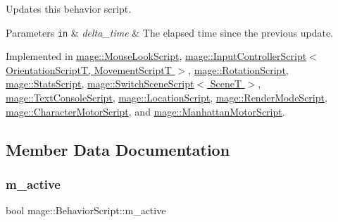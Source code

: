 Updates this behavior script.


\begin{DoxyParams}[1]{Parameters}
\mbox{\tt in}  & {\em delta\+\_\+time} & The elapsed time since the previous update. \\
\hline
\end{DoxyParams}


Implemented in \hyperlink{classmage_1_1_mouse_look_script_a7962403a78c02b2fe64e8f06f6319312}{mage\+::\+Mouse\+Look\+Script}, \hyperlink{classmage_1_1_input_controller_script_a2b91f7c131dee5d09ac38e2878a715e3}{mage\+::\+Input\+Controller\+Script$<$ Orientation\+Script\+T, Movement\+Script\+T $>$}, \hyperlink{classmage_1_1_rotation_script_a96936107b1b955cce5e84b8081f930bb}{mage\+::\+Rotation\+Script}, \hyperlink{classmage_1_1_stats_script_abb2f4de15b51b72e54dc893ecd947fad}{mage\+::\+Stats\+Script}, \hyperlink{classmage_1_1_switch_scene_script_a8faac4e2f6f571f13aecf488057f7dfb}{mage\+::\+Switch\+Scene\+Script$<$ Scene\+T $>$}, \hyperlink{classmage_1_1_text_console_script_a7b1acbf48376b650c08fa941a63ffa98}{mage\+::\+Text\+Console\+Script}, \hyperlink{classmage_1_1_location_script_a3ffe0474c573e2cf858aee62056324a3}{mage\+::\+Location\+Script}, \hyperlink{classmage_1_1_render_mode_script_a13d76eb4e8362cb519cc3cf98102094f}{mage\+::\+Render\+Mode\+Script}, \hyperlink{classmage_1_1_character_motor_script_af09581e810c02ca4a19ecbaf0d7580bb}{mage\+::\+Character\+Motor\+Script}, and \hyperlink{classmage_1_1_manhattan_motor_script_aa2aee651ef777e71ac8da8345f86b212}{mage\+::\+Manhattan\+Motor\+Script}.



\subsection{Member Data Documentation}
\hypertarget{classmage_1_1_behavior_script_a18f81792aed31a2d61a8a75784e2ceef}{}\label{classmage_1_1_behavior_script_a18f81792aed31a2d61a8a75784e2ceef} 
\subsubsection{\texorpdfstring{m\+\_\+active}{m\_active}}
{\footnotesize\ttfamily bool mage\+::\+Behavior\+Script\+::m\+\_\+active\hspace{0.3cm}{\ttfamily [private]}}

